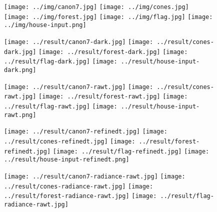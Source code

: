 \documentclass{article}
\begin{document}
\begin{figure}[H]
    \centering
    \begin{minipage}[b]{\linewidth}
        \centering
        \texttt{[image: ../img/canon7.jpg]}
        \texttt{[image: ../img/cones.jpg]}
        \texttt{[image: ../img/forest.jpg]}
        \texttt{[image: ../img/flag.jpg]}
        \texttt{[image: ../img/house-input.png]}
    \end{minipage}
    \begin{minipage}[b]{\linewidth}
        \centering
        \texttt{[image: ../result/canon7-dark.jpg]}
        \texttt{[image: ../result/cones-dark.jpg]}
        \texttt{[image: ../result/forest-dark.jpg]}
        \texttt{[image: ../result/flag-dark.jpg]}
        \texttt{[image: ../result/house-input-dark.png]}
    \end{minipage}
    \begin{minipage}[b]{\linewidth}
        \centering
        \texttt{[image: ../result/canon7-rawt.jpg]}
        \texttt{[image: ../result/cones-rawt.jpg]}
        \texttt{[image: ../result/forest-rawt.jpg]}
        \texttt{[image: ../result/flag-rawt.jpg]}
        \texttt{[image: ../result/house-input-rawt.png]}
    \end{minipage}
    \begin{minipage}[b]{\linewidth}
        \centering
        \texttt{[image: ../result/canon7-refinedt.jpg]}
        \texttt{[image: ../result/cones-refinedt.jpg]}
        \texttt{[image: ../result/forest-refinedt.jpg]}
        \texttt{[image: ../result/flag-refinedt.jpg]}
        \texttt{[image: ../result/house-input-refinedt.png]}
    \end{minipage}
    \begin{minipage}[b]{\linewidth}
        \centering
        \texttt{[image: ../result/canon7-radiance-rawt.jpg]}
        \texttt{[image: ../result/cones-radiance-rawt.jpg]}
        \texttt{[image: ../result/forest-radiance-rawt.jpg]}
        \texttt{[image: ../result/flag-radiance-rawt.jpg]}

\end{minipage}
\end{figure}
\end{document}
